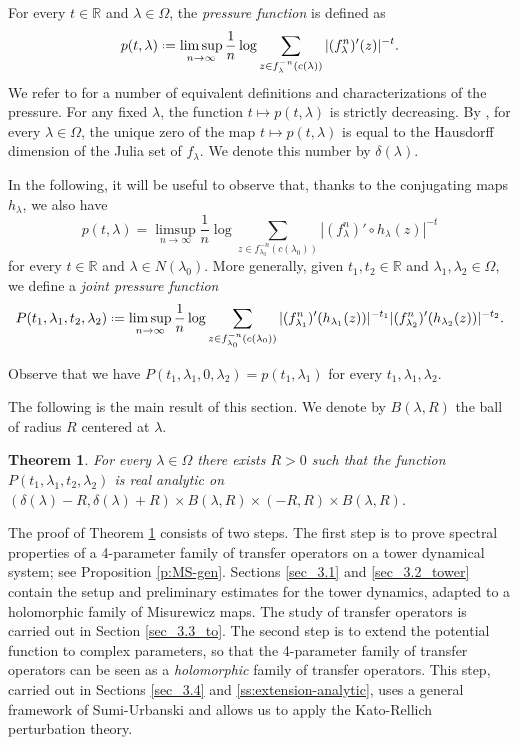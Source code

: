 \documentclass[11pt]{amsart}
\theoremstyle{plain}
\newtheorem{thm}{Theorem}[section]
\theoremstyle{definition}
\theoremstyle{remark}
\newcommand*{\defeq}{\mathrel{\vcenter{\baselineskip0.5ex \lineskiplimit0pt
			\hbox{\scriptsize.}\hbox{\scriptsize.}}}%
	=}
\begin{document}
\medskip


For every $t \in \mathbb R$ and $\lambda \in \Omega$,
the {\it pressure function} is defined as
\begin{equation}\label{def_pressure}
p (t,\lambda)
\defeq
\limsup_{n\to \infty}
\frac{1}{n} \log \sum_{z\in f_\lambda^{-n} (c(\lambda))} 
|
(f_\lambda^n)' (z)|^{-t}.  
\end{equation}
We refer to \cite{PRLS04} for a number of equivalent definitions and characterizations of the pressure. 
For any fixed $\lambda$, the function
$t\mapsto p(t,\lambda)$ is strictly decreasing.
By \cite{McMullen00}, for every $\lambda\in \Omega$, the unique 
zero of the map
$t\mapsto p(t,\lambda)$
is equal to the Hausdorff dimension of the Julia set of $f_\lambda$. We denote this number by $\delta(\lambda)$.

\medskip

 In the following, it will be useful to observe that, thanks to the conjugating maps $h_\lambda$, we also have
\[
p (t,\lambda)
=
\limsup_{n\to \infty}
\frac{1}{n} \log \sum_{z\in f_{\lambda_0}^{-n} (c(\lambda_0))} 
|
(f_{\lambda}^n)'
\circ h_\lambda
(z)|^{-t}
\]
for every $t\in \mathbb R$ and $\lambda \in N(\lambda_0)$.
More generally, given
$t_1,t_2\in \mathbb R$ and
$\lambda_1, \lambda_2\in\Omega$, we define a \emph{joint pressure function}
\begin{equation}\label{eq:def-pressure-gen}
P(t_1,\lambda_1, t_2, \lambda_2)
\defeq
\limsup_{n\to \infty}
\frac{1}{n} \log \sum_{z\in f_{\lambda_0}^{-n} (c(\lambda_0))} 
|(f_{\lambda_1}^n)' ({ h_{\lambda_1}}(z))|^{-t_1}
|(f_{\lambda_2}^n)' ({ h_{\lambda_2}}(z))|^{-t_2}. 
\end{equation}

Observe that we have $P(t_1,\lambda_1,0, \lambda_2)= p(t_1, \lambda_1)$
for every $t_1, \lambda_1,\lambda_2$.

\medskip

The following is the main result of this section.
We denote by $B(\lambda,R)$ the ball of radius $R$ centered at $\lambda$.
\begin{thm}\label{t:new-analytic-all}
For every $\lambda\in \Omega$ there exists $R>0$ such that the function $P(t_1,\lambda_1, t_2, \lambda_2)$ is real analytic on 
$(\delta(\lambda)-R, \delta(\lambda)+R)
\times 
B(\lambda,R)
\times (-R,
R)\times
B(\lambda,R)$.
\end{thm}

The proof of Theorem \ref{t:new-analytic-all} consists of two steps. The first step is to prove spectral properties of a 4-parameter family of transfer operators on a tower dynamical system; see Proposition \ref{p:MS-gen}. Sections \ref{sec_3.1} and \ref{sec_3.2_tower} contain the setup and preliminary estimates for the tower dynamics, adapted to a holomorphic family of Misurewicz maps. The study of transfer operators is carried out in Section \ref{sec_3.3_to}. 
The second step is to extend the potential function
 to complex parameters,
so that the 4-parameter family of transfer operators
 can be seen as
a {\it holomorphic} family of transfer operators.
This step,
carried out in Sections \ref{sec_3.4} and \ref{ss:extension-analytic}, uses a general framework of Sumi-Urbanski \cite{SU10} and allows us to apply the Kato-Rellich perturbation theory.
\end{document}
